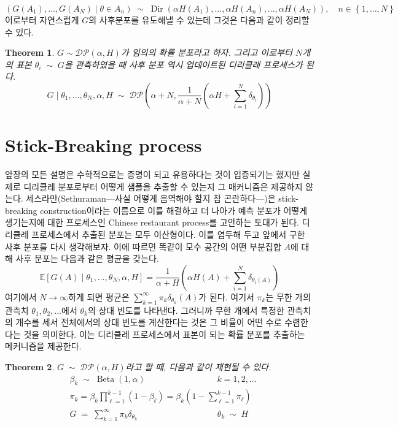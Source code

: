 \documentclass[a4paper, 10pt]{book}
\newtheorem{thm}{Theorem}[section]
\newcommand{\opn}{\operatorname}
\begin{document}
  $$
  \left(G\left(A_{1}\right),\ldots ,G\left(A_{N}\right)\;|\;\theta\in A_{n} \right) \;\sim\; \opn{Dir}\left(\alpha H\left(A_{1}\right),\ldots , \alpha H\left(A_{n}\right), \ldots , \alpha H\left(A_{N}\right)\right),\quad n\in\left\{1,\ldots , N\right\}
  $$
  이로부터 자연스럽게 $G$의 사후분포를 유도해낼 수 있는데 그것은 다음과 같이 정리할 수 있다.
  \begin{thm}
    $G \sim \mathcal{DP}\left(\alpha, H\right)$가 임의의 확률 분포라고 하자. 그리고 이로부터 $N$개의 표본 $\theta_{i} \;\sim\; G$을 관측하였을 때 사후 분포 역시 업데이트된 디리클레 프로세스가 된다.
    $$
      G\;|\;\theta_{1},\ldots ,\theta_{N},\alpha,H \;\sim\; \mathcal{DP}\left(\alpha+ N, \frac{1}{\alpha + N}\left(\alpha H+\sum_{i=1}^{N}\delta_{\theta_{i}}\right)\right)
    $$
  \end{thm}
\section{Stick-Breaking process}
  앞장의 모든 설명은 수학적으로는 증명이 되고 유용하다는 것이 입증되기는 했지만 실제로 디리클레 분포로부터 어떻게 샘플을 추출할 수 있는지 그 매커니즘은 제공하지 않는다. 세스라만(Sethuraman---사실 어떻게 음역해야 할지 참 곤란하다---)은 stick-breaking construction이라는 이름으로 이를 해결하고 더 나아가 예측 분포가 어떻게 생기는지에 대한 프로세스인 Chinese restaurant process를 고안하는 토대가 된다. 디리클레 프로세스에서 추출된 분포는 모두 이산형이다. 이를 염두해 두고 앞에서 구한 사후 분포를 다시 생각해보자. 이에 따르면 똑같이 모수 공간의 어떤 부분집합 $A$에 대해 사후 분포는 다음과 같은 평균을 갖는다.
  \begin{equation}
    \mathbb{E}\left[G\left(A\right)\;|\;\theta_{1},\ldots , \theta_{N},\alpha, H\right] = \frac{1}{\alpha+H}\left(\alpha H\left(A\right)+\sum_{i=1}^{N}\delta_{\theta_{i}\left(A\right)}\right)
  \end{equation}
  여기에서 $N\to\infty$하게 되면 평균은 $\sum_{k=1}^{\infty}\pi_{k}\delta_{\theta_{k}}\left(A\right)$가 된다. 여기서 $\pi_{k}$는 무한 개의 관측치 $\theta_{1},\theta_{2},\ldots$에서 $\theta_{k}$의 상대 빈도를 나타낸다. 그러니까 무한 개에서 특정한 관측치의 개수를 세서 전체에서의 상대 빈도를 계산한다는 것은 그 비율이 어떤 수로 수렴한다는 것을 의미한다. 이는 디리클레 프로세스에서 표본이 되는 확률 분포를 추출하는 메커니즘을 제공한다.
  \begin{thm}
    $G\;\sim\; \mathcal{DP}\left(\alpha, H\right)$라고 할 때, 다음과 같이 재현될 수 있다.
    \begin{align*}
      &\beta_{k}\;\sim\;\opn{Beta}\left(1,\alpha\right)\hspace{100pt} k=1,2,\ldots\\
      &\pi_{k} = \beta_{k}\prod_{\ell=1}^{k-1}\left(1-\beta_{\ell}\right) = \beta_{k}\left(1-\sum_{\ell=1}^{k-1}\pi_{\ell}\right)\\
      &G\;=\;\sum_{k=1}^{\infty}\pi_{k}\delta_{\theta_{k}}\hspace{111pt} \theta_{k}\;\sim\; H
    \end{align*}
  \end{thm}
  
\end{document}
